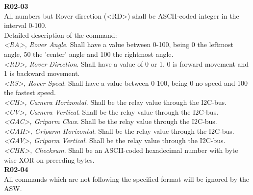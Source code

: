 \textbf{R02-03}\\
All numbers but Rover direction (<RD>) shall be ASCII-coded integer in the interval 0-100.\\

Detailed description of the command:\\

\textit{<RA>, Rover Angle}. Shall have a value between 0-100, being 0 the leftmost angle, 50 the 'center' angle and 100 the rightmost angle.\\

\textit{<RD>, Rover Direction}. Shall have a value of 0 or 1. 0 is forward movement and 1 is backward movement.\\

\textit{<RS>, Rover Speed}. Shall have a value between 0-100, being 0 no speed and 100 the fastest speed.\\

\textit{<CH>, Camera Horizontal}. Shall be the relay value through the I2C-bus.\\

\textit{<CV>, Camera Vertical}. Shall be the relay value through the I2C-bus.\\

\textit{<GAC>, Griparm Claw}. Shall be the relay value through the I2C-bus.\\

\textit{<GAH>, Griparm Horizontal}. Shall be the relay value through the I2C-bus.\\

\textit{<GAV>, Griparm Vertical}. Shall be the relay value through the I2C-bus.\\

\textit{<CHK>, Checksum}. Shall be an ASCII-coded hexadecimal number with byte wise XOR on preceding bytes.\\

\textbf{R02-04}\\
All commands which are not following the specified format will be ignored by the ASW.\\

